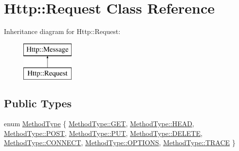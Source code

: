 \hypertarget{classHttp_1_1Request}{}\section{Http\+::Request Class Reference}
\label{classHttp_1_1Request}
Inheritance diagram for Http\+::Request\+:\begin{figure}[H]
\begin{center}
\leavevmode
\includegraphics[height=2.000000cm]{classHttp_1_1Request}
\end{center}
\end{figure}
\subsection*{Public Types}
\begin{DoxyCompactItemize}
\item 
enum \mbox{\hyperlink{classHttp_1_1Request_acb00e56805e8f946c7240b898d823c4d}{Method\+Type}} \{ \newline
\mbox{\hyperlink{classHttp_1_1Request_acb00e56805e8f946c7240b898d823c4da7528035a93ee69cedb1dbddb2f0bfcc8}{Method\+Type\+::\+G\+ET}}, 
\mbox{\hyperlink{classHttp_1_1Request_acb00e56805e8f946c7240b898d823c4dae15e216fc1c639f787b1231ecdfa1bf8}{Method\+Type\+::\+H\+E\+AD}}, 
\mbox{\hyperlink{classHttp_1_1Request_acb00e56805e8f946c7240b898d823c4daa02439ec229d8be0e74b0c1602392310}{Method\+Type\+::\+P\+O\+ST}}, 
\mbox{\hyperlink{classHttp_1_1Request_acb00e56805e8f946c7240b898d823c4da3e75383a5992a6d15fb81e872e46e256}{Method\+Type\+::\+P\+UT}}, 
\newline
\mbox{\hyperlink{classHttp_1_1Request_acb00e56805e8f946c7240b898d823c4da32f68a60cef40faedbc6af20298c1a1e}{Method\+Type\+::\+D\+E\+L\+E\+TE}}, 
\mbox{\hyperlink{classHttp_1_1Request_acb00e56805e8f946c7240b898d823c4dab57e2519e26151feacdbe52076bc39ec}{Method\+Type\+::\+C\+O\+N\+N\+E\+CT}}, 
\mbox{\hyperlink{classHttp_1_1Request_acb00e56805e8f946c7240b898d823c4da164dd62adb30ca051b5289672a572f9b}{Method\+Type\+::\+O\+P\+T\+I\+O\+NS}}, 
\mbox{\hyperlink{classHttp_1_1Request_acb00e56805e8f946c7240b898d823c4da2d3e4144aa384b18849ab9a8abad74d6}{Method\+Type\+::\+T\+R\+A\+CE}}
 \}
\end{DoxyCompactItemize}
